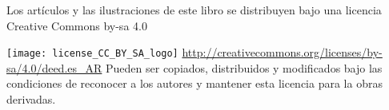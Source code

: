 \begin{center}
Los artículos y las ilustraciones de este libro se 
distribuyen bajo una licencia Creative Commons by-sa 4.0 
\newline

\texttt{[image: license\_CC\_BY\_SA\_logo]}
{\small 
\url{http://creativecommons.org/licenses/by-sa/4.0/deed.es_AR}
}
\newline
Pueden ser copiados, distribuidos y modificados bajo las condiciones 
de reconocer a los autores y mantener esta licencia para la obras derivadas.
\end{center}
